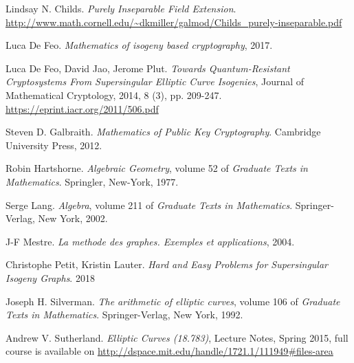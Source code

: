 \documentclass{article}
\theoremstyle{theorem}
\theoremstyle{definition}
\begin{document}
\begin{thebibliography}{}
	 Lindsay N. Childs. \textit{Purely Inseparable Field Extension}. \url{http://www.math.cornell.edu/~dkmiller/galmod/Childs_purely-inseparable.pdf}
	
	 Luca De Feo. \textit{Mathematics of isogeny based cryptography}, 2017.
	
	 Luca De Feo, David Jao, Jerome Plut. \textit{Towards Quantum-Resistant Cryptosystems From Supersingular Elliptic Curve Isogenies}, Journal of Mathematical Cryptology, 2014, 8 (3), pp. 209-247. \url{https://eprint.iacr.org/2011/506.pdf}
	
	 Steven D. Galbraith. \textit{Mathematics of Public Key Cryptography}. Cambridge University Press, 2012.
	
	 Robin Hartshorne. \textit{Algebraic Geometry}, volume 52 of \textit{Graduate Texts in Mathematics}. Springler, New-York, 1977.
	
	 Serge Lang. \textit{Algebra}, volume 211 of \textit{Graduate Texts in Mathematics}. Springer-Verlag, New York, 2002.

	 J-F Mestre. \textit{La methode des graphes. Exemples et applications}, 2004.
	
	 Christophe Petit, Kristin Lauter. \textit{Hard and Easy Problems for Supersingular Isogeny Graphs}. 2018
	
	 Joseph H. Silverman. \textit{The arithmetic of elliptic curves}, volume 106 of \textit{Graduate Texts in Mathematics}. Springer-Verlag, New York, 1992.

	 Andrew V. Sutherland. \textit{  Elliptic Curves (18.783)}, Lecture Notes, Spring 2015, full course is available on \url{http://dspace.mit.edu/handle/1721.1/111949#files-area}
	
	
\end{thebibliography}
\end{document}
